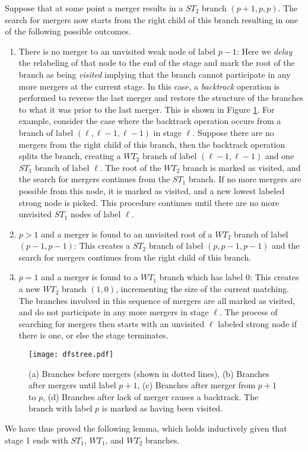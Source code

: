 \documentclass{article}
\begin{document}
Suppose that at some point a merger results in a $ST_2$ branch $(p+1,p, p)$. The search for mergers now starts from the right child of this branch resulting in one of the following possible outcomes.
\begin{enumerate}
\item There is no merger to an unvisited weak node of label $p-1$: Here we {\em delay} the relabeling of that node to the end of the stage and mark the root of the branch as being {\em visited} implying that the branch cannot participate in any more mergers at the current stage.  In this case, a {\em backtrack} operation is performed to reverse the last merger and restore the structure of the branches to what it was prior to the last merger. This is shown in Figure \ref{fig:dfstree2}. For example, consider the case where the backtrack operation occurs from a branch of label $(\ell,\ell-1, \ell-1)$ in stage $\ell$.  Suppose there are no mergers from the right child of this branch, then the backtrack operation splits the branch, creating a $WT_2$  branch of label $(\ell-1, \ell-1)$ and one $ST_1$ branch of label $\ell$. The root of the $WT_2$ branch is marked as visited, and the search for mergers continues from the $ST_1$ branch. If no more mergers are possible from this node, it is marked as visited, and a new lowest labeled strong node is picked.  This procedure continues until there are no more unvisited $ST_1$ nodes of label $\ell$.
\item $p > 1$ and a merger is found to an unvisited root of a $WT_2$ branch of label $(p-1,p-1)$: This creates a $ST_2$ branch of label $(p, p-1, p-1)$ and the search for mergers continues from the right child of this branch.
\item $p=1$ and a merger is found to a $WT_1$ branch which has label $0$: This creates a new $WT_2$ branch $(1,0)$, incrementing the size of the current matching. The branches involved in this sequence of mergers are all marked as visited, and do not participate in any more mergers in stage $\ell$. The process of searching for mergers then starts with an unvisited $\ell$ labeled strong node if there is one, or else the stage terminates.
\end{enumerate}

\begin{figure}[ht]
\centerline{\texttt{[image: dfstree.pdf]}}
\caption{\label{fig:dfstree2}
(a) Branches before mergers (shown in dotted lines),
(b) Branches after mergers until label $p+1$,
(c) Branches after merger from $p+1$ to $p$,
(d) Branches after lack of merger causes a backtrack.
The branch with label $p$ is marked as having been visited.}
\end{figure}
\noindent We have thus proved the following lemma, which holds inductively given that stage 1 ends with $ST_1$, $WT_1$, and $WT_2$ branches.
\end{document}
